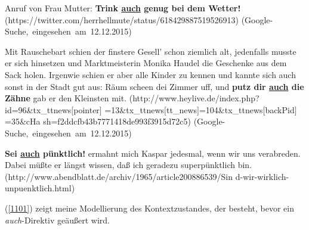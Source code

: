{\begin{exe}
	\ex\label{1098} 
	\scriptsize
 	Anruf von Frau Mutter: \glqq \textbf{Trink \underline{auch} genug bei dem Wetter!}\grqq{}
	\newline
	\hbox{}\hfill\hbox{(https://twitter.com/herrhellmute/status/618429887519526913)}				 
  	\newline
	\hbox{}\hfill\hbox{(Google-Suche, eingesehen am 12.12.2015)}		
\end{exe}	
								                    
\begin{exe}
	\ex\label{1099} 
	\scriptsize
 	Mit Rauschebart schien der finstere Gesell' schon ziemlich alt, jedenfalls musste er sich hinsetzen und Marktmeisterin Monika Haudel die Geschenke aus 		dem Sack holen. Irgenwie schien er aber alle Kinder zu kennen und kannte sich auch sonst in der Stadt gut aus: \glqq Räum scheen dei Zimmer uff, und 		\textbf{putz dir \underline{auch} die Zähne}\grqq{} gab er den Kleinsten mit. 
	\newline
	\hbox{}\hfill\hbox{(http://www.heylive.de/index.php?id=96\&tx\_ttnews$[$pointer$]$}				 
  	\newline
	\hbox{}\hfill\hbox{=13\&tx\_ttnews$[$tt\_news$]$=104\&tx\_ttnews$[$backPid$]$=35\&cHa}		
	\newline
	\hbox{}\hfill\hbox{sh=f2ddcfb43b7771418de993f3915d72c5)}
	\newline
	\hbox{}\hfill\hbox{(Google-Suche, eingesehen am 12.12.2015)}
\end{exe}
									
\begin{exe}
	\ex\label{1100} 
	\scriptsize
 	\glqq \textbf{Sei \underline{auch} pünktlich!}\grqq{} ermahnt mich Kaspar jedesmal, wenn wir uns verabreden. Dabei müßte er längst wissen, daß ich 			geradezu superpünktlich bin.
	\newline
	\hbox{}\hfill\hbox{(http://www.abendblatt.de/archiv/1965/article200886539/Sin}				 
  	\newline
	\hbox{}\hfill\hbox{d-wir-wirklich-unpuenktlich.html)}		
\end{exe}
(\ref{1101}) zeigt meine Modellierung des Kontextzustandes, der besteht, bevor ein \textit{auch}-Direktiv geäußert wird.

}
